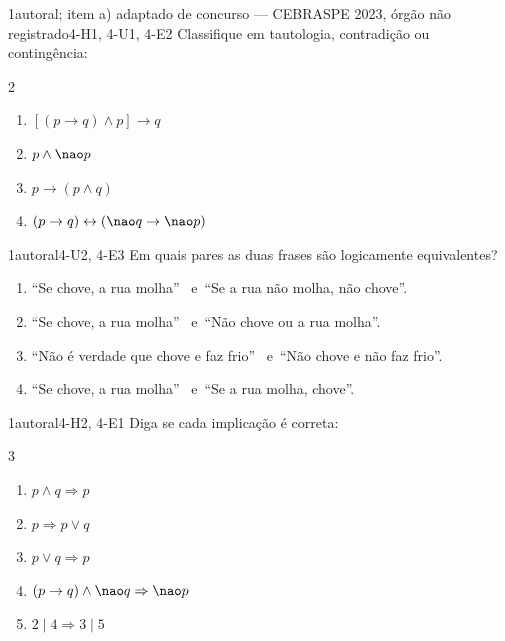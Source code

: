 \begin{questao}{1}{autoral; item a) adaptado de concurso — CEBRASPE 2023, órgão não registrado}{4-H1, 4-U1, 4-E2}\label{u4:q1}
Classifique em tautologia, contradição ou contingência:
\begin{multicols}{2}
\begin{enumerate}[label=\alph*)]
  \item $[(p\rightarrow q)\wedge p]\rightarrow q$
  \item $p\wedge{\nao}p$
  \item $p\rightarrow(p\wedge q)$
  \item $(p\rightarrow q)\leftrightarrow({\nao}q\rightarrow{\nao}p)$
\end{enumerate}
\end{multicols}
\end{questao}

\begin{questao}{1}{autoral}{4-U2, 4-E3}\label{u4:q2}
Em quais pares as duas frases são logicamente equivalentes?
\begin{enumerate}[label=(\roman*)]
  \item \enquote{Se chove, a rua molha} \ e\ \enquote{Se a rua não molha, não chove}.
  \item \enquote{Se chove, a rua molha} \ e\ \enquote{Não chove ou a rua molha}.
  \item \enquote{Não é verdade que chove e faz frio} \ e\ \enquote{Não chove e não faz frio}.
  \item \enquote{Se chove, a rua molha} \ e\ \enquote{Se a rua molha, chove}.
\end{enumerate}
\end{questao}

\begin{questao}{1}{autoral}{4-H2, 4-E1}\label{u4:q3}
Diga se cada implicação é correta:
\begin{multicols}{3}
\begin{enumerate}[label=\alph*)]
  \item $p\wedge q\Rightarrow p$
  \item $p\Rightarrow p\vee q$
  \item $p\vee q\Rightarrow p$
  \item $(p\rightarrow q)\wedge{\nao}q\Rightarrow{\nao}p$
  \item $2\mid4\Rightarrow3\mid5$
\end{enumerate}
\end{multicols}
\end{questao}

